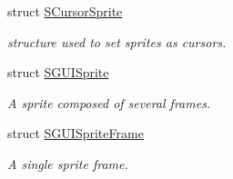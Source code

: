 \begin{DoxyCompactItemize}
struct \hyperlink{structirr_1_1gui_1_1SCursorSprite}{S\+Cursor\+Sprite}
\begin{DoxyCompactList}\small\item\em structure used to set sprites as cursors. \end{DoxyCompactList}\item 
struct \hyperlink{structirr_1_1gui_1_1SGUISprite}{S\+G\+U\+I\+Sprite}
\begin{DoxyCompactList}\small\item\em A sprite composed of several frames. \end{DoxyCompactList}\item 
struct \hyperlink{structirr_1_1gui_1_1SGUISpriteFrame}{S\+G\+U\+I\+Sprite\+Frame}
\begin{DoxyCompactList}\small\item\em A single sprite frame. \end{DoxyCompactList}\end{DoxyCompactItemize}

